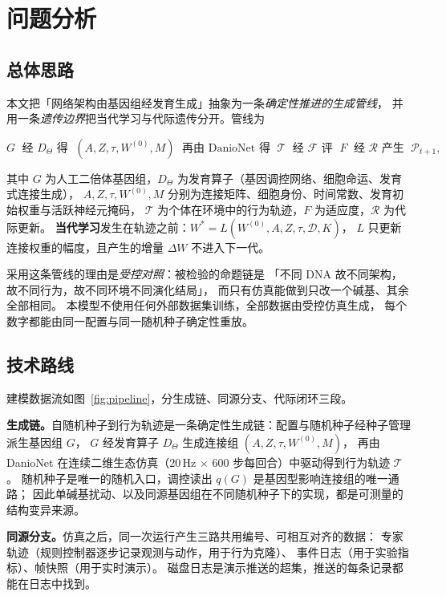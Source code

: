 \section{问题分析}\label{sec:analysis}

\subsection{总体思路}

本文把「网络架构由基因组经发育生成」抽象为一条\emph{确定性推进的生成管线}，
并用一条\emph{遗传边界}把当代学习与代际遗传分开。管线为

\begin{equation}\label{eq:pipeline}
G\;\text{ 经 } D_{\Theta} \text{ 得 }\; (A,Z,\tau,W^{(0)},M)
\;\text{ 再由 DanioNet 得 }\; \mathcal{T}
\;\text{ 经 }\mathcal{F}\text{ 评 }\; F
\;\text{ 经 }\mathcal{R}\text{ 产生 }\; \mathcal{P}_{t+1},
\end{equation}

其中 $G$ 为人工二倍体基因组，$D_\Theta$ 为发育算子（基因调控网络、细胞命运、发育式连接生成），
$A,Z,\tau,W^{(0)},M$ 分别为连接矩阵、细胞身份、时间常数、发育初始权重与活跃神经元掩码，
$\mathcal{T}$ 为个体在环境中的行为轨迹，$F$ 为适应度，$\mathcal R$ 为代际更新。
\textbf{当代学习}发生在轨迹之前：$W^{*}=L(W^{(0)},A,Z,\tau,\mathcal{D},K)$，
$L$ 只更新连接权重的幅度，且产生的增量 $\Delta W$ 不进入下一代。

采用这条管线的理由是\emph{受控对照}：被检验的命题链是
「不同 DNA 故不同架构，故不同行为，故不同环境不同演化结局」，
而只有仿真能做到只改一个碱基、其余全部相同。
本模型不使用任何外部数据集训练，全部数据由受控仿真生成，
每个数字都能由同一配置与同一随机种子确定性重放。

\subsection{技术路线}

建模数据流如图~\ref{fig:pipeline}，分生成链、同源分支、代际闭环三段。

\textbf{生成链。}自随机种子到行为轨迹是一条确定性生成链：配置与随机种子经种子管理派生基因组 $G$，
$G$ 经发育算子 $D_{\Theta}$ 生成连接组 $(A,Z,\tau,W^{(0)},M)$，
再由 DanioNet 在连续二维生态仿真（$20$\,Hz $\times$ $600$ 步每回合）中驱动得到行为轨迹 $\mathcal{T}$。
随机种子是唯一的随机入口，调控读出 $q(G)$ 是基因型影响连接组的唯一通路；
因此单碱基扰动、以及同源基因组在不同随机种子下的实现，都是可测量的结构变异来源。

\textbf{同源分支。}仿真之后，同一次运行产生三路共用编号、可相互对齐的数据：
专家轨迹（规则控制器逐步记录观测与动作，用于行为克隆）、
事件日志（用于实验指标）、帧快照（用于实时演示）。
磁盘日志是演示推送的超集，推送的每条记录都能在日志中找到。

